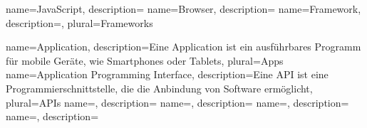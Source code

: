 
{
	name=JavaScript,
	description={}
}
{
	name=Browser,
	description={}
}
{
	name=Framework,
	description={},
	plural=Frameworks
}

{
	name=Application,
	description={Eine Application ist ein ausführbares Programm für mobile Geräte, wie Smartphones oder Tablets},
	plural=Apps
}
{
	name=Application Programming Interface,
	description={Eine API ist eine Programmierschnittstelle, die die Anbindung von Software ermöglicht},
	plural=APIs
}
{
	name=,
	description={}
}
{
	name=,
	description={}
}
{
	name=,
	description={}
}
{
	name=,
	description={}
}
